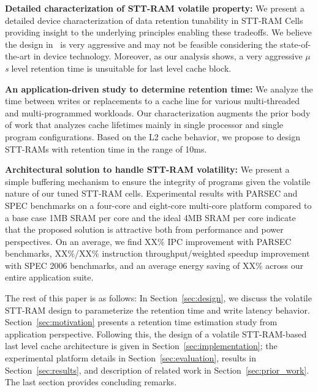 \noindent\textbf{Detailed characterization of STT-RAM volatile property:} We present a detailed
device characterization of data retention tunability in STT-RAM Cells providing insight to the
underlying principles enabling these tradeoffs. We believe the design in~\cite{STTRAM:HPCA11} is very
aggressive and may not be feasible considering the state-of-the-art in device technology. Moreover,
as our analysis shows, a very aggressive {\it $\mu$s} level retention time is unsuitable for last
level cache block.

\noindent\textbf{An application-driven study to determine retention time:}
We analyze the time between writes or replacements to a cache line for
various multi-threaded and multi-programmed workloads. Our characterization
augments the prior body of work that analyzes cache lifetimes mainly in
single processor and single program configurations. Based on the L2 cache
behavior, we propose to design STT-RAMs with retention time in the range of 10ms.

\noindent\textbf{Architectural solution to handle STT-RAM volatility:} We present a simple buffering
mechanism to ensure the integrity of programs given the volatile nature of our tuned STT-RAM cells.
Experimental results with PARSEC and SPEC benchmarks on a four-core and eight-core multi-core platform
compared to a base case 1MB SRAM per core and the ideal 4MB SRAM per core indicate that the proposed
solution is attractive both from performance and power perspectives. On an average, we find XX\% IPC
improvement with PARSEC benchmarks, XX\%/XX\% instruction throughput/weighted speedup improvement
with SPEC 2006 benchmarks, and an average energy saving of XX\% across our entire application suite.



The rest of this paper is as follows: In Section~\ref{sec:design}, we discuss the volatile STT-RAM design to
parameterize the retention time and write latency behavior. Section~\ref{sec:motivation} presents a retention time
estimation study from application perspective. Following this, the design of a volatile STT-RAM-based last
level cache architecture is given in Section~\ref{sec:implementation}; the experimental platform details in Section~\ref{sec:evaluation},
results in Section~\ref{sec:results}, and description of related work in Section~\ref{sec:prior_work}.
The last section provides concluding remarks.


